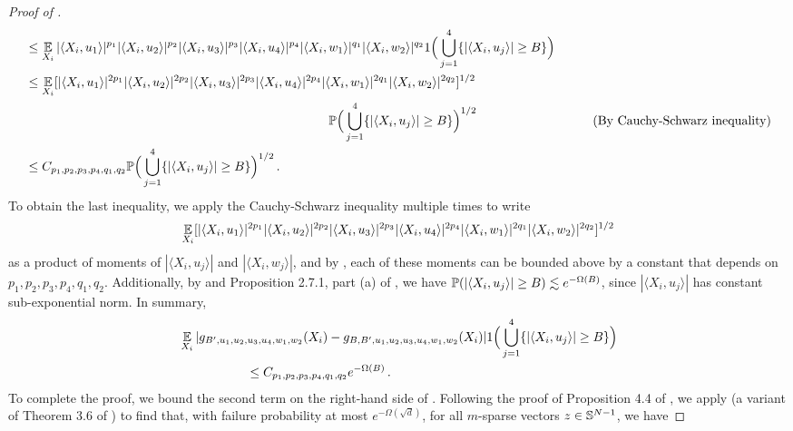 \begin{proof}[Proof of ]
\begin{align}
& \leq \operatorname*{\mathbb{E}}_{X_i} |\langle X_i, u_1 \rangle|^{p_1} |\langle X_i, u_2 \rangle|^{p_2} |\langle X_i, u_3 \rangle|^{p_3} |\langle X_i, u_4 \rangle|^{p_4} |\langle X_i, w_1 \rangle|^{q_1} |\langle X_i, w_2 \rangle|^{q_2}  1\Big(\bigcup_{j = 1}^4 \{|\langle X_i, u_j \rangle| \geq B\} \Big) \\
& \leq \operatorname*{\mathbb{E}}_{X_i} [|\langle X_i, u_1 \rangle|^{2 p_1} |\langle X_i, u_2 \rangle|^{2 p_2} |\langle X_i, u_3 \rangle|^{2 p_3} |\langle X_i, u_4 \rangle|^{2 p_4} |\langle X_i, w_1 \rangle|^{2 q_1} |\langle X_i, w_2 \rangle|^{2 q_2}]^{1/2} \\
& \,\,\,\,\,\,\,\,\,\,\,\,\,\,\,\,\,\,\,\,\,\,\,\,\,\,\,\,\,\,\,\,\,\,\,\,\,\,\,\,\,\,\,\,\,\,\,\,\,\,\,\,\,\,\,\,\,\,\,\,\,\,\,\,\,\,\,\,\,\,\,\,\,\,\,\,\,\,\,\,\,\,\,\,\,\,\,\,\,\,\,\,\,\,\,\,\,\,\,\,\,\,\,\,\,\,\,\,\,\,\,\,\,\,\,\,\,\,\,\,\,\,\,\,\,\,\,\,\,\,\,\,\,\,\,\,\,\,\,\,\,\,\,\, \mathbb{P}\Big(\bigcup_{j = 1}^4 \{|\langle X_i, u_j \rangle| \geq B\} \Big)^{1/2}
& \tag{By Cauchy-Schwarz inequality} \\
& \leq C_{p_1, p_2, p_3, p_4, q_1, q_2} \mathbb{P}\Big(\bigcup_{j = 1}^4 \{|\langle X_i, u_j \rangle| \geq B\} \Big)^{1/2} \,.
\end{align}
To obtain the last inequality, we apply the Cauchy-Schwarz inequality multiple times to write 
\begin{align}
\operatorname*{\mathbb{E}}_{X_i} [|\langle X_i, u_1 \rangle|^{2 p_1} |\langle X_i, u_2 \rangle|^{2 p_2} |\langle X_i, u_3 \rangle|^{2 p_3} |\langle X_i, u_4 \rangle|^{2 p_4} |\langle X_i, w_1 \rangle|^{2 q_1} |\langle X_i, w_2 \rangle|^{2 q_2}]^{1/2}
\end{align}
as a product of moments of $|\langle X_i, u_j \rangle|$ and $|\langle X_i, w_j \rangle|$, and by , each of these moments can be bounded above by a constant that depends on $p_1, p_2, p_3, p_4, q_1, q_2$. Additionally, by  and Proposition 2.7.1, part (a) of \citet{vershynin2018high}, we have $\mathbb{P}(|\langle X_i, u_j \rangle| \geq B) \lesssim e^{-\Omega(B)}$, since $|\langle X_i, u_j \rangle|$ has constant sub-exponential norm. In summary,
\begin{align}
& \operatorname*{\mathbb{E}}_{X_i} |g_{B', u_1, u_2, u_3, u_4, w_1, w_2}(X_i) - g_{B, B', u_1, u_2, u_3, u_4, w_1, w_2}(X_i)| 1\Big(\bigcup_{j = 1}^4 \{|\langle X_i, u_j \rangle| \geq B\} \Big) \\
& \,\,\,\,\,\,\,\,\,\,\,\,\,\,\,\,\,\,\,\,\,\,\,\,\,\,\,\,\,\,\,\, \leq C_{p_1, p_2, p_3, p_4, q_1, q_2} e^{-\Omega(B)} \,.
\end{align}
To complete the proof, we bound the second term on the right-hand side of . Following the proof of Proposition 4.4 of \citet{ALPT2009_concentration}, we apply  (a variant of Theorem 3.6 of \citet{ALPT2009_concentration}) to find that, with failure probability at most $e^{-\Omega(\sqrt{d})}$, for all $m$-sparse vectors $z \in \mathbb{S}^{N - 1}$, we have

\end{proof}
